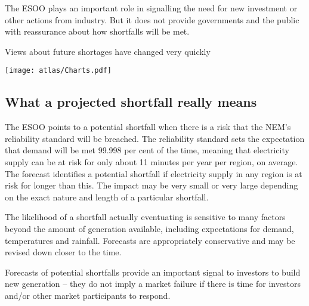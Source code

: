 \documentclass[FrontPage]{grattan}
\begin{document}
The ESOO plays an important role in signalling the need for new investment or other actions from industry. But it does not provide governments and the public with reassurance about how shortfalls will be met. 

\begin{figureTop}
\caption{Views about future shortages have changed very quickly}\label{fig:resource-adequacy-projections-over-time}
\texttt{[image: atlas/Charts.pdf]}
\end{figureTop}

\subsection{What a projected shortfall really means}\label{subsec:what-a-projected-shortfall-really-means} 
The ESOO points to a potential shortfall when there is a risk that the NEM’s reliability standard will be breached. The reliability standard sets the expectation that demand will be met 99.998 per cent of the time, meaning that electricity supply can be at risk for only about 11 minutes per year per region, on average. The forecast identifies a potential shortfall if electricity supply in any region is at risk for longer than this. The impact may be very small or very large depending on the exact nature and length of a particular shortfall.

The likelihood of a shortfall actually eventuating is sensitive to many factors beyond the amount of generation available, including expectations for demand, temperatures and rainfall. Forecasts are appropriately conservative and may be revised down closer to the time.

Forecasts of potential shortfalls provide an important signal to investors to build new generation -- they do not imply a market failure if there is time for investors and/or other market participants to respond.
\end{document}
